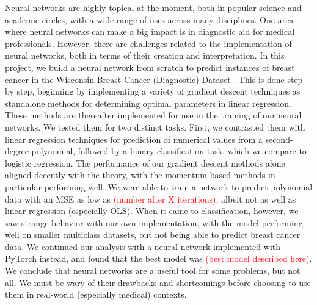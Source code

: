 \begin{adjustwidth}{2cm}{2cm} %
    Neural networks are highly topical at the moment, both in popular science and academic circles, with a wide range of uses across many disciplines. One area where neural networks can make a big impact is in diagnostic aid for medical professionals. However, there are challenges related to the implementation of neural networks, both in terms of their creation and interpretation. In this project, we build a neural network from scratch to predict instances of breast cancer in the Wisconsin Breast Cancer (Diagnostic) Dataset \cite{sklearnBreastCancerData}. This is done step by step, beginning by implementing a variety of gradient descent techniques as standalone methods for determining optimal parameters in linear regression. These methods are thereafter implemented for use in the training of our neural networks. We tested them for two distinct tasks. First, we contrasted them with linear regression techniques for prediction of numerical values from a second-degree polynomial, followed by a binary classification task, which we compare to logistic regression. The performance of our gradient descent methods alone aligned decently with the theory, with the momentum-based methods in particular performing well. We were able to train a network to predict polynomial data with an MSE as low as \textcolor{red}{(number after X iterations)}, albeit not as well as linear regression (especially OLS). When it came to classification, however, we saw strange behavior with our own implementation, with the model performing well on smaller multiclass datasets, but not being able to predict breast cancer data. We continued our analysis with a neural network implemented with PyTorch instead, and found that the best model was \textcolor{red}{(best model described here)}. We conclude that neural networks are a useful tool for some problems, but not all. We must be wary of their drawbacks and shortcomings before choosing to use them in real-world (especially medical) contexts.
      \end{adjustwidth}

